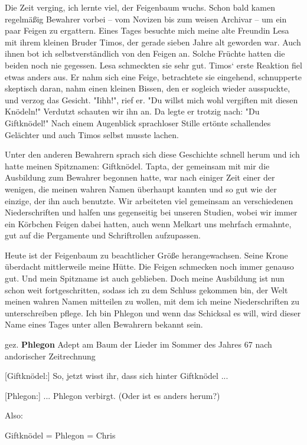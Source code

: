 \documentclass[10pt, a4paper, oneside]{book}
\begin{document}
\begin{multicols}{2}
Die Zeit verging, ich lernte viel, der Feigenbaum wuchs. Schon bald kamen regelmäßig Bewahrer vorbei – vom Novizen bis zum weisen Archivar – um ein paar Feigen zu ergattern. Eines Tages besuchte mich meine alte Freundin Lesa mit ihrem kleinen Bruder Timos, der gerade sieben Jahre alt geworden war. Auch ihnen bot ich selbstverständlich von den Feigen an. Solche Früchte hatten die beiden noch nie gegessen. Lesa schmeckten sie sehr gut. Timos‘ erste Reaktion fiel etwas anders aus. Er nahm sich eine Feige, betrachtete sie eingehend, schnupperte skeptisch daran, nahm einen kleinen Bissen, den er sogleich wieder ausspuckte, und verzog das Gesicht. "Iihh!", rief er. "Du willst mich wohl vergiften mit diesen Knödeln!" Verdutzt schauten wir ihn an. Da legte er trotzig nach: "Du Giftknödel!" Nach einem Augenblick sprachloser Stille ertönte schallendes Gelächter und auch Timos selbst musste lachen.\bigskip

Unter den anderen Bewahrern sprach sich diese Geschichte schnell herum und ich hatte meinen Spitznamen: Giftknödel. Tapta, der gemeinsam mit mir die Ausbildung zum Bewahrer begonnen hatte, war nach einiger Zeit einer der wenigen, die meinen wahren Namen überhaupt kannten und so gut wie der einzige, der ihn auch benutzte. Wir arbeiteten viel gemeinsam an verschiedenen Niederschriften und halfen uns gegenseitig bei unseren Studien, wobei wir immer ein Körbchen Feigen dabei hatten, auch wenn Melkart uns mehrfach ermahnte, gut auf die Pergamente und Schriftrollen aufzupassen.\bigskip

Heute ist der Feigenbaum zu beachtlicher Größe herangewachsen. Seine Krone überdacht mittlerweile meine Hütte. Die Feigen schmecken noch immer genauso gut. Und mein Spitzname ist auch geblieben. Doch meine Ausbildung ist nun schon weit fortgeschritten, sodass ich zu dem Schluss gekommen bin, der Welt meinen wahren Namen mitteilen zu wollen, mit dem ich meine Niederschriften zu unterschreiben pflege. Ich bin Phlegon und wenn das Schicksal es will, wird dieser Name eines Tages unter allen Bewahrern bekannt sein.\bigskip

gez. \textbf{Phlegon}
Adept am Baum der Lieder im Sommer des Jahres 67 nach andorischer Zeitrechnung\bigskip

[Giftknödel:] So, jetzt wisst ihr, dass sich hinter Giftknödel ...

[Phlegon:] ... Phlegon verbirgt. (Oder ist es anders herum?)

Also:

Giftknödel = Phlegon = Chris


\end{multicols}
\end{document}
